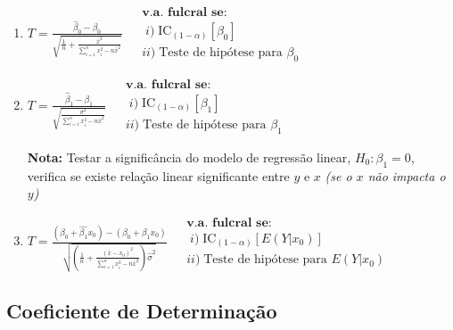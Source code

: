 \begin{mdframed}
    \begin{enumerate}[leftmargin=*,label=\textbf{\arabic*)}]
        \item $\displaystyle T = \frac{\hat{\beta}_0 - \beta_0}{\sqrt{\displaystyle \frac{1}{n} + \frac{\bar{x}^2}{\sum^{n}_{i=1} x^2_i -n\bar{x}^2}}}$ \hfill $\begin{aligned} &\textbf{v.a. fulcral se:} \\ &\;i)\; \text{IC}_{(1-\alpha)}[\beta_0] \\ &ii)\;\text{Teste de hipótese para }\beta_0 \end{aligned}$

        \item $\displaystyle T = \frac{\hat{\beta}_1 - \beta_1}{\sqrt{\displaystyle \frac{\sigma^2}{\sum^{n}_{i=1} x^2_i -n\bar{x}^2}}}$ \hfill $\begin{aligned} &\textbf{v.a. fulcral se:} \\ &\;i)\; \text{IC}_{(1-\alpha)}[\beta_1] \\ &ii)\;\text{Teste de hipótese para }\beta_1 \end{aligned}$

        \textbf{Nota:} Testar a significância do modelo de regressão linear, $H_0 : \beta_1 = 0$, verifica se existe relação linear significante entre $y$ e $x$ \hfill {\small \textit{(se o $x$ não impacta o $y$)}}

        \item $\displaystyle T = \frac{(\hat{\beta_0} + \hat{\beta_1} x_0) - (\beta_0 + \beta_1 x_0)}{\sqrt{\displaystyle \left(\frac{1}{n} + \frac{(\bar{x} - x_0)^2}{\sum^{n}_{i=1} x^2_i -n\bar{x}^2}\right) \hat{\sigma}^2}}$ \hfill $\begin{aligned} &\textbf{v.a. fulcral se:} \\ &\;i)\; \text{IC}_{(1-\alpha)}[E(Y|x_0)] \\ &ii)\;\text{Teste de hipótese para }E(Y|x_0) \end{aligned}$
    \end{enumerate}
\end{mdframed}

\subsection[7.3 Coeficiente de Determinação]{\hspace*{0.075 em}\raisebox{0.2 em}{$\pmb{\drsh}$} Coeficiente de Determinação}

